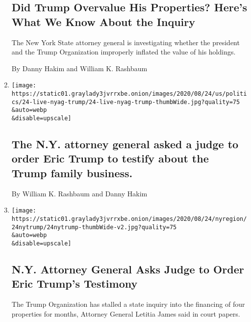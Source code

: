 \begin{enumerate}
  \hypertarget{did-trump-overvalue-his-properties-heres-what-we-know-about-the-inquiry}{%
  \subsection{Did Trump Overvalue His Properties? Here's What We Know
  About the
  Inquiry}\label{did-trump-overvalue-his-properties-heres-what-we-know-about-the-inquiry}}

  The New York State attorney general is investigating whether the
  president and the Trump Organization improperly inflated the value of
  his holdings.

  By Danny Hakim and William K. Rashbaum
\item
  \href{/2020/08/24/us/elections/the-ny-attorney-general-asked-a-judge-to-order-eric-trump-to-testify-about-the-trump-family-business.html}{}

  \texttt{[image: https://static01.graylady3jvrrxbe.onion/images/2020/08/24/us/politics/24-live-nyag-trump/24-live-nyag-trump-thumbWide.jpg?quality=75\\\&auto=webp\\\&disable=upscale]}

  \hypertarget{the-ny-attorney-general-asked-a-judge-to-order-eric-trump-to-testify-about-the-trump-family-business}{%
  \subsection{The N.Y. attorney general asked a judge to order Eric
  Trump to testify about the Trump family
  business.}\label{the-ny-attorney-general-asked-a-judge-to-order-eric-trump-to-testify-about-the-trump-family-business}}

  By William K. Rashbaum and Danny Hakim
\item
  \href{/2020/08/24/nyregion/letitia-james-trump-projects-investigation.html}{}

  \texttt{[image: https://static01.graylady3jvrrxbe.onion/images/2020/08/24/nyregion/24nytrump/24nytrump-thumbWide-v2.jpg?quality=75\\\&auto=webp\\\&disable=upscale]}

  \hypertarget{ny-attorney-general-asks-judge-to-order-eric-trumps-testimony}{%
  \subsection{N.Y. Attorney General Asks Judge to Order Eric Trump's
  Testimony}\label{ny-attorney-general-asks-judge-to-order-eric-trumps-testimony}}

  The Trump Organization has stalled a state inquiry into the financing
  of four properties for months, Attorney General Letitia James said in
  court papers.


\end{enumerate}
